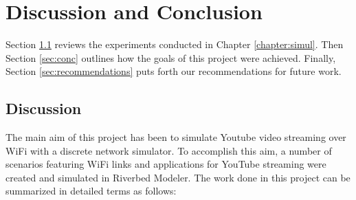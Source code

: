 \chapter{Discussion and Conclusion} \label{chapter:discussion}


Section \ref{sec:discussion} reviews the experiments conducted in Chapter \ref{chapter:simul}. Then Section \ref{sec:conc} outlines how the goals of this project were achieved. Finally, Section \ref{sec:recommendations} puts forth our recommendations for future work.

\section{Discussion} \label{sec:discussion}
The main aim of this project has been to simulate Youtube video streaming over \gls{WiFi} with a discrete network simulator. To accomplish this aim, a number of scenarios featuring \gls{WiFi} links and applications for YouTube streaming were created and simulated in Riverbed Modeler. The work done in this project can be summarized in detailed terms as follows:


